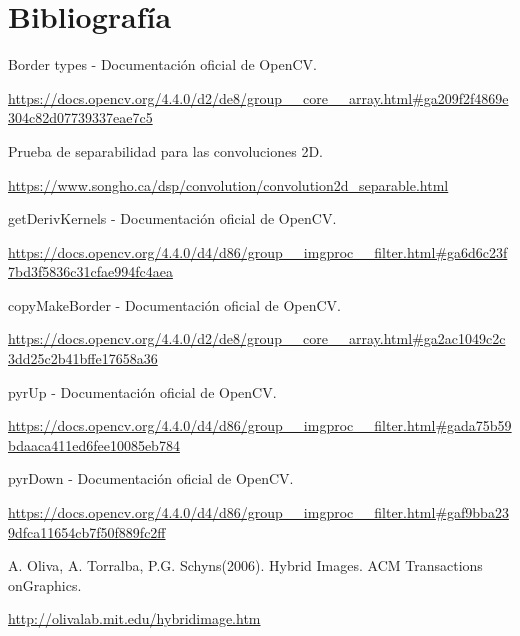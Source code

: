 \documentclass[12pt,spanish]{article}
\begin{document}
\section{Bibliografía}


\begin{thebibliography}{9}

	Border types - Documentación oficial de OpenCV.

	\url{https://docs.opencv.org/4.4.0/d2/de8/group__core__array.html#ga209f2f4869e304c82d07739337eae7c5}

	Prueba de separabilidad para las convoluciones 2D.

	\url{https://www.songho.ca/dsp/convolution/convolution2d_separable.html}

	getDerivKernels - Documentación oficial de OpenCV.

	\url{https://docs.opencv.org/4.4.0/d4/d86/group__imgproc__filter.html#ga6d6c23f7bd3f5836c31cfae994fc4aea}


	copyMakeBorder - Documentación oficial de OpenCV.

	\url{https://docs.opencv.org/4.4.0/d2/de8/group__core__array.html#ga2ac1049c2c3dd25c2b41bffe17658a36}

	pyrUp - Documentación oficial de OpenCV.

	\url{https://docs.opencv.org/4.4.0/d4/d86/group__imgproc__filter.html#gada75b59bdaaca411ed6fee10085eb784}

	pyrDown - Documentación oficial de OpenCV.

	\url{https://docs.opencv.org/4.4.0/d4/d86/group__imgproc__filter.html#gaf9bba239dfca11654cb7f50f889fc2ff}


	A. Oliva, A. Torralba, P.G. Schyns(2006). Hybrid Images. ACM Transactions onGraphics.

	\url{http://olivalab.mit.edu/hybridimage.htm}


\end{thebibliography}
\end{document}
